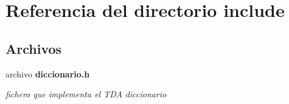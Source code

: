 \section{Referencia del directorio include}
\label{dir_d44c64559bbebec7f509842c48db8b23}
\subsection*{Archivos}
\begin{DoxyCompactItemize}
\item 
archivo {\bf diccionario.\+h}
\begin{DoxyCompactList}\small\item\em fichero que implementa el T\+DA diccionario \end{DoxyCompactList}\end{DoxyCompactItemize}
